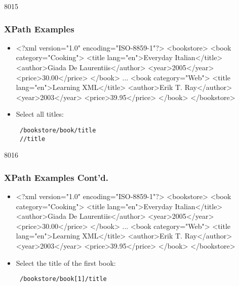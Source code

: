 \begin{slide}[fragile]{8015}
\frametitle{XPath Examples}
\begin{itemize}
\item[]
\begin{xml}
<?xml version="1.0" encoding="ISO-8859-1"?>
<bookstore>
    <book category="Cooking">
        <title lang="en">Everyday Italian</title>
        <author>Giada De Laurentiis</author>
        <year>2005</year>
        <price>30.00</price>
    </book>
    ...
    <book category="Web">
        <title lang="en">Learning XML</title>
        <author>Erik T. Ray</author>
        <year>2003</year>
        <price>39.95</price>
    </book>
</bookstore>
\end{xml}
\vspace{8pt}
\item Select all titles:
\begin{verbatim}
 /bookstore/book/title
 //title
\end{verbatim}
\end{itemize}
\end{slide}


\begin{slide}[fragile]{8016}
\frametitle{XPath Examples Cont'd.}
\begin{itemize}
\item[]
\begin{xml}
<?xml version="1.0" encoding="ISO-8859-1"?>
<bookstore>
    <book category="Cooking">
        <title lang="en">Everyday Italian</title>
        <author>Giada De Laurentiis</author>
        <year>2005</year>
        <price>30.00</price>
    </book>
    ...
    <book category="Web">
        <title lang="en">Learning XML</title>
        <author>Erik T. Ray</author>
        <year>2003</year>
        <price>39.95</price>
    </book>
</bookstore>
\end{xml}
\vspace{8pt}
\item Select the title of the first book:
\begin{verbatim}
 /bookstore/book[1]/title
\end{verbatim}
\end{itemize}
\end{slide}


